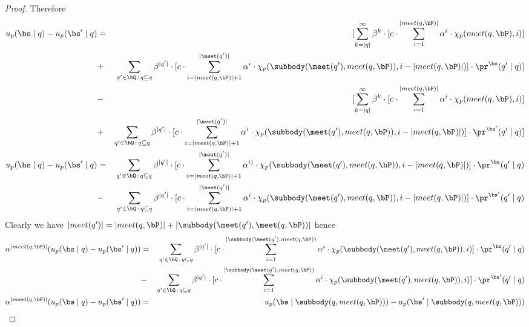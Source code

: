 \begin{proof}
	Therefore
	\begin{eqnarray*}
		u_p(\bs \mid q) - u_p(\bs' \mid q) & = & [\sum_{k = |q|}^{\infty} \beta^{k} \cdot  [{\displaystyle c \cdot \sum_{i=1}^{|meet(q,\bP)|} \alpha^i \cdot \chi_p(meet(q,\bP),i) }] \\
		&+ & \sum_{q' \in \bQ \,:\, q \subseteq q} \beta^{|q'|} \cdot  [{\displaystyle c \cdot \sum_{i=|meet(q,\bP)|+1}^{|\meet(q')|} \alpha^{i} \cdot \chi_p(\subbody(\meet(q'),meet(q,\bP)),i-|meet(q,\bP)|)  }] \cdot \pr^{\bs}(q' \mid q) ]\\ 
		&- &[\sum_{k = |q|}^{\infty} \beta^{k} \cdot  [{\displaystyle c \cdot \sum_{i=1}^{|meet(q,\bP)|} \alpha^i \cdot \chi_p(meet(q,\bP),i) }] \\
		&+ & \sum_{q' \in \bQ \,:\, q \subseteq q} \beta^{|q'|} \cdot  [{\displaystyle c \cdot \sum_{i=|meet(q,\bP)|+1}^{|\meet(q')|} \alpha^{i} \cdot \chi_p(\subbody(\meet(q'),meet(q,\bP)),i-|meet(q,\bP)|)  }] \cdot \pr^{\bs'}(q' \mid q) ]\\ 
		u_p(\bs \mid q) - u_p(\bs' \mid q) & = & \sum_{q' \in \bQ \,:\, q \subseteq q} \beta^{|q'|} \cdot  [{\displaystyle c \cdot \sum_{i=|meet(q,\bP)|+1}^{|\meet(q')|} \alpha^{i)} \cdot \chi_p(\subbody(\meet(q'),meet(q,\bP)),i-|meet(q,\bP)|)  }] \cdot \pr^{\bs}(q' \mid q) \\ 
		& - & \sum_{q' \in \bQ \,:\, q \subseteq q} \beta^{|q'|} \cdot  [{\displaystyle c \cdot \sum_{i=|meet(q,\bP)|+1}^{|\meet(q')|} \alpha^{i} \cdot \chi_p(\subbody(\meet(q'),meet(q,\bP)),i-|meet(q,\bP)|)  }] \cdot \pr^{\bs'}(q' \mid q) \\
	\end{eqnarray*}
	Clearly we have $|meet(q')| = |meet(q,\bP)| + |\subbody(\meet(q'),\meet(q,\bP))| $ hence 
	\begin{eqnarray*}
		\alpha^{|meet(q,\bP)|} (u_p(\bs \mid q) - u_p(\bs' \mid q)) & = & \sum_{q' \in \bQ \,:\, q \subseteq q} \beta^{|q'|} \cdot  [{\displaystyle c \cdot \sum_{i=1}^{|\subbody(\meet(q'),meet(q,\bP))} \alpha^{i} \cdot \chi_p(\subbody(\meet(q'),meet(q,\bP)),i)  }] \cdot \pr^{\bs}(q' \mid q) \\ 
		& - & \sum_{q' \in \bQ \,:\, q \subseteq q} \beta^{|q'|} \cdot  [{\displaystyle c \cdot \sum_{i=1}^{|\subbody(\meet(q'),meet(q,\bP))} \alpha^{i} \cdot \chi_p(\subbody(\meet(q'),meet(q,\bP)),i)  }] \cdot \pr^{\bs'}(q' \mid q) \\
		\alpha^{|meet(q,\bP)|} (u_p(\bs \mid q) - u_p(\bs' \mid q)) & = & u_p(\bs \mid \subbody(q,meet(q,\bP))) - u_p(\bs' \mid \subbody(q,meet(q,\bP))) \\
	\end{eqnarray*}
\end{proof}
\fi

